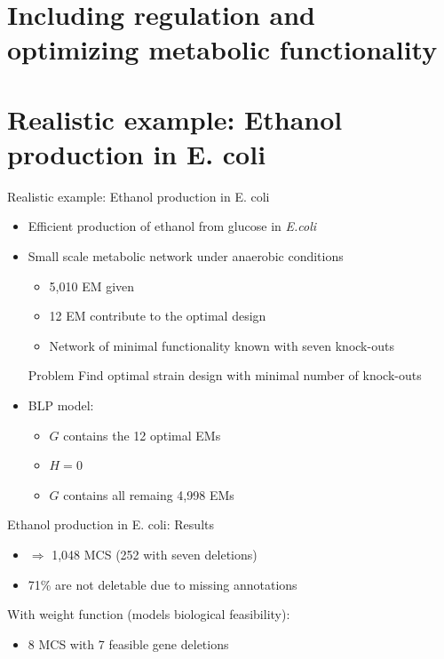 \documentclass{beamer}
\begin{document}
\section{Including regulation and optimizing metabolic functionality}


\section{Realistic example: Ethanol production in E. coli}
\begin{frame}{Realistic example: Ethanol production in E. coli}
	\begin{itemize}
		\item Efficient production of ethanol from glucose in \emph{E.coli}
		\item Small scale metabolic network under anaerobic conditions
		\begin{itemize}
			\item 5,010 EM given
			\item 12 EM contribute to the optimal design
			\item Network of minimal functionality known with seven knock-outs
		\end{itemize}
	\begin{block}{Problem}
		 Find optimal strain design with minimal number of knock-outs 
	\end{block}

		\item BLP model:
		\begin{itemize}
			\item $G$ contains the 12 optimal EMs
			\item $H=0$
			\item $G$ contains all remaing 4,998 EMs
		\end{itemize}
	\end{itemize}
\end{frame}

\begin{frame}{Ethanol production in E. coli: Results}
	\begin{itemize}
	\item $\Rightarrow$ 1,048 MCS (252 with seven deletions)
	\item 71\% are not deletable due to missing annotations
	\end{itemize}
With weight function (models biological feasibility):
	\begin{itemize}
		\item 8 MCS with 7 feasible gene deletions		
	\end{itemize}
\end{frame}
\end{document}
